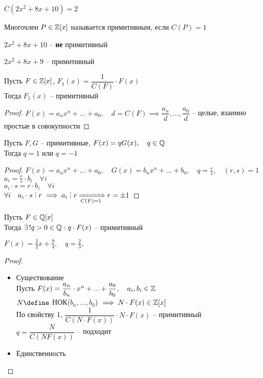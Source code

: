 \begin{eg}
	$C(2x^2 + 8x + 10) = 2$
\end{eg}

\begin{definition}
    Многочлен $P \in \mathbb{Z}[x]$ называется примитивным, если $C(P) = 1$
\end{definition}

\begin{exmpls}
    \item $2x^2 + 8x + 10$ -- \textbf{не} примитивный
    \item $2x^2 + 8x + 9$ -- примитивный
\end{exmpls}

\begin{props}
    \item Пусть $F \in \mathbb{Z}[x]$, $F_1(x) = \dfrac1{C(F)} \cdot F(x)$ \\
    Тогда $F_1(x)$ -- примитивный
    \begin{proof}
        $ F(x) = a_nx^n + ... + a_0, \quad d = C(F) \implies \dfrac{a_n}d, ..., \dfrac{a_0}d$ -- целые, взаимно простые в совокупности
    \end{proof}
    \item Пусть $F, G$ -- примитивные, $F(x) = qG(x), \quad q \in \mathbb{Q}$ \\
    Тогда $q = 1$ или $q = -1$
    \begin{proof}
        $F(x) = a_nx^n + ... + a_0, \quad G(x) = b_nx^n + ... + b_0, \quad q = \frac{r}s, \quad (r, s) = 1$ \\
        $a_i = \frac{r}s \cdot b_i \quad \forall i$ \\
        $a_i \cdot s = r \cdot b_i \quad \forall i$ \\
        $ \forall i \quad a_i \cdot s \divby r \implies a_i \divby r \underimp{C(F) = 1} r = \pm 1$
    \end{proof}
    \item Пусть $F \in \mathbb{Q}[x]$ \\
    Тогда $\exists\,! q > 0 \in \mathbb{Q} : q \cdot F(x)$ -- примитивный
    \begin{eg}
    	$F(x) = \frac32 x + \frac94, \quad q = \frac23, \quad $
    \end{eg}
    \begin{proof}
        \hfill
        \begin{itemize}
        	\item Существование \\
            Пусть $F(x) = \dfrac{a_n}{b_n} \cdot x^n + ... + \dfrac{a_0}{b_0}, \quad a_i, b_i \in \mathbb{Z}$ \\
            $ N \define$ НОК($b_n, ..., b_0$) $\implies N \cdot F(x) \in \mathbb{Z}[x]$ \\
            По свойству 1, $\dfrac1{C(N \cdot F(x))} \cdot N \cdot F(x)$ -- примитивный \\
            $q = \dfrac{N}{C(NF(x))}$ -- подходит
            \item Единственность
        \end{itemize}
    \end{proof}
\end{props}

